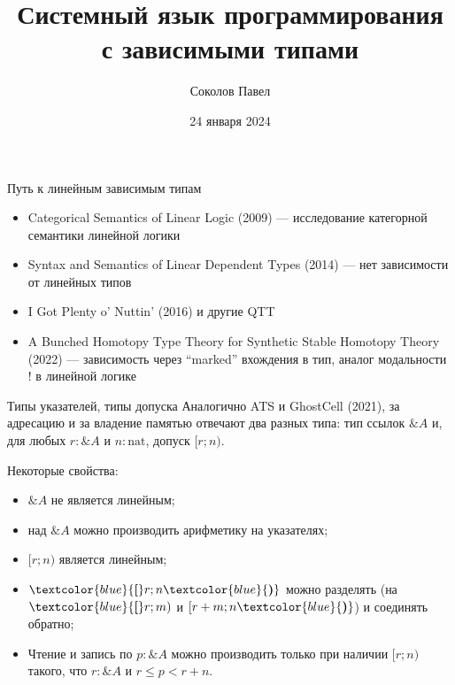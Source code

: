 \documentclass{beamer}
\title{Системный язык программирования с зависимыми типами}
\author{Соколов Павел}
\date{24 января 2024}
\begin{document}
\frame{\titlepage}

\begin{frame}{Путь к линейным зависимым типам}
  \begin{itemize}
    \item Categorical Semantics of Linear Logic (2009) --- исследование
      категорной семантики линейной логики
    \item Syntax and Semantics of Linear Dependent Types (2014) --- нет
      зависимости от линейных типов
    \item I Got Plenty o’ Nuttin’ (2016) и другие QTT
    \item A Bunched Homotopy Type Theory for Synthetic Stable Homotopy Theory
      (2022) --- зависимость через ``marked'' вхождения в тип, аналог
      модальности $!$ в линейной логике
  \end{itemize}
\end{frame}



\begin{frame}{Типы указателей, типы допуска}
  Аналогично ATS и GhostCell (2021), за адресацию и за владение памятью
  отвечают два разных типа: тип ссылок $\& A$ и, для любых $r : \& A$ и
  $n : \mathrm{nat}$, допуск $[r; n)$.

  Некоторые свойства:
  \begin{itemize}
    \item $\& A$ не является линейным;
    \item над $\& A$ можно производить арифметику на указателях;
    \item $[r; n)$ является линейным;
    \item $\textcolor{blue}{\boldsymbol{[}}r; n\textcolor{blue}{\boldsymbol{)}}$
      можно разделять (на $\textcolor{blue}{\boldsymbol{[}}r; m)$ и
      $[r + m; n\textcolor{blue}{\boldsymbol{)}}$) и соединять обратно;
    \item Чтение и запись по $p : \& A$ можно производить только при наличии
      $[r; n)$ такого, что $r : \& A$ и $r \leq p < r + n$.
  \end{itemize}
\end{frame}
\end{document}
